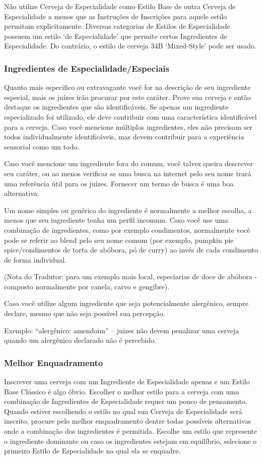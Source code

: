 Não utilize Cerveja de Especialidade como Estilo Base de outra Cerveja de Especialidade a menos que as Instruções de Inscrições para aquele estilo permitam explicitamente. Diversas categorias de Estilos de Especialidade possuem um estilo ‘de Especialidade’ que permite certos Ingredientes de Especialidade. Do contrário, o estilo de cerveja 34B ‘Mixed-Style’ pode ser usado.

\subsubsection*{Ingredientes de Especialidade/Especiais}
Quanto mais especifico ou extravagante você for na descrição de seu ingrediente especial, mais os juízes irão procurar por este caráter. Prove sua cerveja e então destaque os ingredientes que são identificáveis. Se apenas um ingrediente especializado foi utilizado, ele deve contribuir com uma característica identificável para a cerveja. Caso você mencione múltiplos ingredientes, eles não precisam ser todos individualmente identificáveis, mas devem contribuir para a experiência sensorial como um todo.

Caso você mencione um ingrediente fora do comum, você talvez queira descrever seu caráter, ou ao menos verificar se uma busca na internet pelo seu nome trará uma referência útil para os juízes. Fornecer um termo de busca é uma boa alternativa.

Um nome simples ou genérico do ingrediente é normalmente a melhor escolha, a menos que seu ingrediente tenha um perfil incomum. Caso você use uma combinação de ingredientes, como por exemplo condimentos, normalmente você pode se referir ao blend pelo seu nome comum (por exemplo, pumpkin pie spice/condimentos de torta de abóbora, pó de curry) ao invés de cada condimento de forma individual.

(Nota do Tradutor: para um exemplo mais local, especiarias de doce de abóbora - composto normalmente por canela, carvo e gengibre).

Caso você utilize algum ingrediente que seja potencialmente alergênico, sempre declare, mesmo que não seja possível sua percepção.

Exemplo: “alergênico: amendoim” – juizes não devem penalizar uma cerveja quando um alergênico declarado não é percebido.

\subsubsection*{Melhor Enquadramento}
Inscrever uma cerveja com um Ingrediente de Especialidade apenas e um Estilo Base Clássico é algo óbvio. Escolher o melhor estilo para a cerveja com uma combinação de Ingredientes de Especialidade requer um pouco de pensamento. Quando estiver escolhendo o estilo no qual sua Cerveja de Especialidade será inscrito, procure pelo melhor enquadramento dentre todas possíveis alternativas onde a combinação dos ingredientes é permitida. Escolhe um estilo que represente o ingrediente dominante ou caso os ingredientes estejam em equilíbrio, selecione o primeiro Estilo de Especialidade na qual ela se enquadre.

